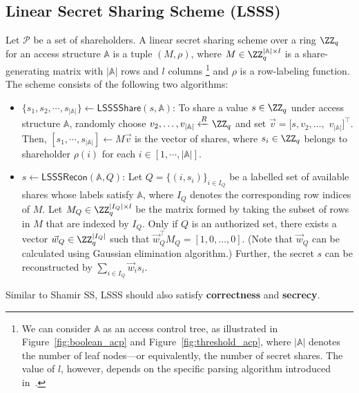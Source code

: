 \documentclass[runningheads]{llncs}
\newcommand{\lsssshare}{\mathsf{LSSSShare}}
\newcommand{\lsssrecon}{\mathsf{LSSSRecon}}
\begin{document}
\subsection{Linear Secret Sharing Scheme (LSSS)}
\begin{definition}
\label{def:LSSS}
Let $\mathcal{P}$ be a set of shareholders. A linear secret sharing scheme over a ring $\ZZ_q$ for an access structure $\mathbb{A}$ is a tuple $(M, \rho)$, where $M \in \ZZ_q^{|\mathbb{A}| \times l}$ is a share-generating matrix with $|\mathbb{A}|$ rows and $l$ columns
\footnote{We can consider \(\mathbb{A}\) as an access control tree, as illustrated in Figure~\ref{fig:boolean_acp} and Figure~\ref{fig:threshold_acp}, where \(|\mathbb{A}|\) denotes the number of leaf nodes—or equivalently, the number of secret shares. The value of \(l\), however, depends on the specific parsing algorithm introduced in~\cite{Lewko2011DABE,Liu2010LSSS}.} and $\rho$ is a row-labeling function. The scheme consists of the following two algorithms:
\begin{itemize}
    \item $\{s_1,s_2,\cdots,s_{|\mathbb{A}|}\} \gets \lsssshare(s, \mathbb{A})$: To share a value $s \in \ZZ_q$ under access structure $\mathbb{A}$, randomly choose $v_2, \dots, v_{|\mathbb{A}|} \xleftarrow{R} \ZZ_q$ and set $\vec{v} = [s, v_2, \dots,$ $v_{|\mathbb{A}|}]^{\top}$. Then, $[s_1,\cdots,s_{|\mathbb{A}|}] \gets M\vec{v}$ is the vector of shares, where $s_i \in \ZZ_q$ belongs to shareholder $\rho(i)$ for each $i \in [1,\cdots, |\mathbb{A}|]$.
    \item $s \gets \lsssrecon(\mathbb{A}, Q)$: Let $Q=\{(i,s_i)\}_{i\in I_Q}$ be a labelled set of available shares whose labels satisfy $\mathbb{A}$, where $I_Q$ denotes the corresponding row indices of $M$. Let $M_Q \in \ZZ_q^{|I_Q| \times l}$ be the matrix formed by taking the subset of rows in $M$ that are indexed by $I_Q$. Only if $Q$ is an authorized set, there exists a vector $\vec{w}_Q \in \ZZ_q^{|I_Q|}$ such that $\vec{w}_Q^{\top} M_Q = [1, 0, \dots, 0]$. (Note that $\vec{w}_Q$ can be calculated using Gaussian elimination algorithm.)
    Further, the secret $s$ can be reconstructed by $\sum_{i \in I_Q} \vec{w}_i s_i$.
\end{itemize}

Similar to Shamir SS, LSSS should also satisfy \textbf{correctness} and \textbf{secrecy}.
\end{definition}
\end{document}
